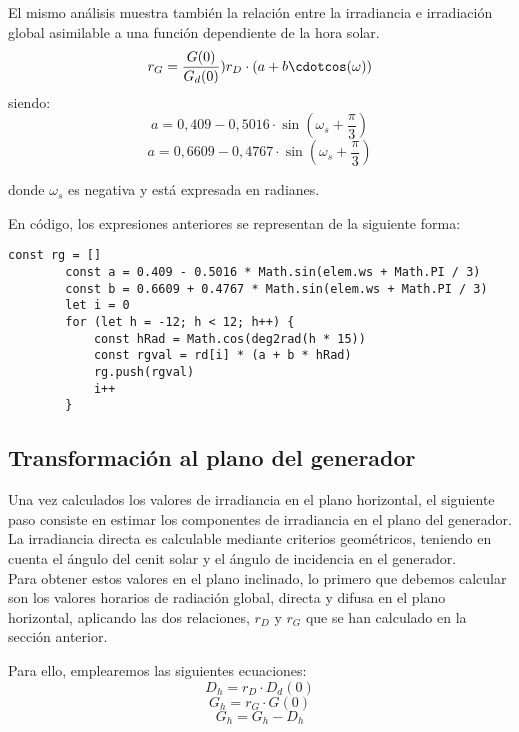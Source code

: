 El mismo análisis muestra también la relación entre la irradiancia e irradiación global asimilable a una función dependiente de la hora solar.
\begin{equation}
r_G = \frac{G(0)}{G_d(0)} ) r_D\cdot(a+b\cdotcos(\omega))
\end{equation}
siendo:
\begin{equation}
a=0,409 - 0,5016\cdot\sin(\omega_s+\frac{\pi}{3})
\end{equation}
\begin{equation}
a=0,6609 - 0,4767\cdot\sin(\omega_s+\frac{\pi}{3})
\end{equation}

donde $\omega_s$ es negativa y está expresada en radianes.

En código, los expresiones anteriores se representan de la siguiente forma:
\begin{lstlisting}[style=ES6, caption={Cálculo de rG}]
		const rg = []
		const a = 0.409 - 0.5016 * Math.sin(elem.ws + Math.PI / 3)
		const b = 0.6609 + 0.4767 * Math.sin(elem.ws + Math.PI / 3)
		let i = 0
		for (let h = -12; h < 12; h++) {
			const hRad = Math.cos(deg2rad(h * 15))
			const rgval = rd[i] * (a + b * hRad)
			rg.push(rgval)
			i++
		}
\end{lstlisting}

\subsection{Transformación al plano del generador}

Una vez calculados los valores de irradiancia en el plano horizontal, el siguiente paso consiste en estimar los componentes de irradiancia en el plano del generador. La irradiancia directa es calculable mediante criterios geométricos, teniendo en cuenta el ángulo del cenit solar y el ángulo de incidencia en el generador.\\

Para obtener estos valores en el plano inclinado, lo primero que debemos calcular son los valores horarios de radiación global, directa y difusa en el plano horizontal, aplicando las dos relaciones, $r_D$ y $r_G$ que se han calculado en la sección anterior.

Para ello, emplearemos las siguientes ecuaciones:
\begin{equation}
D_h = r_D \cdot D_d(0)
\end{equation}
\begin{equation}
G_h = r_G \cdot G(0)
\end{equation}
\begin{equation}
G_h = G_h - D_h
\end{equation}

